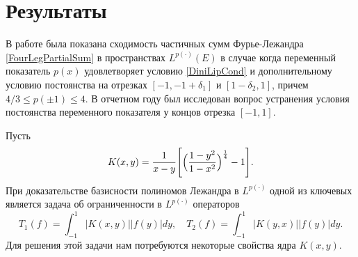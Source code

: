 

\section{Результаты}

В работе \cite{tad-SHII-Leg} была показана сходимость частичных сумм Фурье-Лежандра  \eqref{FourLegPartialSum} в пространствах $L^{p(\cdot)}(E)$ в случае когда переменный показатель $p(x)$ удовлетворяет условию \eqref{DiniLipCond} и дополнительному условию постоянства на отрезках $[-1,-1+\delta_1]$ и $[1-\delta_2,1]$, причем $4/3\le p(\pm1)\le4$. В отчетном году был исследован вопрос устранения условия постоянства переменного показателя у концов отрезка $[-1,1]$.

Пусть
\begin{equation}
K(x,y)=\frac{1}{x-y}\Biggl[ \Bigl(\frac{1-y^2}{1-x^2} \Bigr)^\frac14 - 1 \Biggr].
\end{equation}
При доказательстве базисности полиномов Лежандра в $L^{p(\cdot)}$ одной из ключевых является задача об ограниченности в $L^{p(\cdot)}$ операторов
\begin{equation}\label{T1T2-def}
T_1(f)=\int_{-1}^1 |K(x,y)||f(y)|dy, \quad
T_2(f)=\int_{-1}^1 |K(y,x)||f(y)|dy.
\end{equation}
Для решения этой задачи нам потребуются некоторые свойства ядра $K(x,y)$.

